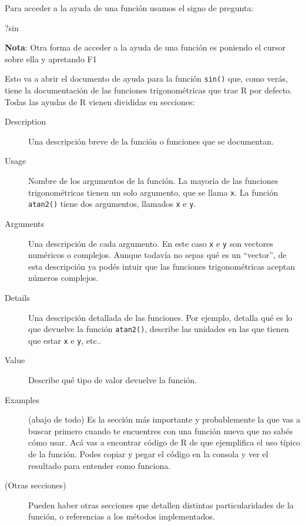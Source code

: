 \documentclass[
  openany]{book}
\newenvironment{Shaded}{\begin{snugshade}}{\end{snugshade}}
\newcommand{\NormalTok}[1]{#1}
\begin{document}
Para acceder a la ayuda de una función usamos el signo de pregunta:

\begin{Shaded}
\begin{Highlighting}[]
\NormalTok{?sin}
\end{Highlighting}
\end{Shaded}

\textbf{Nota}: Otra forma de acceder a la ayuda de una función es poniendo el cursor sobre ella y apretando F1

Esto va a abrir el documento de ayuda para la función \texttt{sin()} que, como verás, tiene la documentación de las funciones trigonométricas que trae R por defecto.
Todas las ayudas de R vienen divididas en secciones:

\begin{description}
\item[Description]
Una descripción breve de la función o funciones que se documentan.
\item[Usage]
Nombre de los argumentos de la función.
La mayoría de las funciones trigonométricas tienen un solo argumento, que se llama \texttt{x}.
La función \texttt{atan2()} tiene dos argumentos, llamados \texttt{x} e \texttt{y}.
\item[Arguments]
Una descripción de cada argumento.
En este caso \texttt{x} e \texttt{y} son vectores numéricos o complejos.
Aunque todavía no sepas qué es un ``vector'', de esta descripción ya podés intuir que las funciones trigonométricas aceptan números complejos.
\item[Details]
Una descripción detallada de las funciones.
Por ejemplo, detalla qué es lo que devuelve la función \texttt{atan2()}, describe las unidades en las que tienen que estar \texttt{x} e \texttt{y}, etc..
\item[Value]
Describe qué tipo de valor devuelve la función.
\item[Examples]
(abajo de todo) Es la sección más importante y probablemente la que vas a buscar primero cuando te encuentres con una función nueva que no sabés cómo usar.
Acá vas a encontrar código de R de que ejemplifica el uso típico de la función.
Podes copiar y pegar el código en la consola y ver el resultado para entender como funciona.
\item[(Otras secciones)]
Pueden haber otras secciones que detallen distintas particularidades de la función, o referencias a los métodos implementados.
\end{description}
\end{document}
